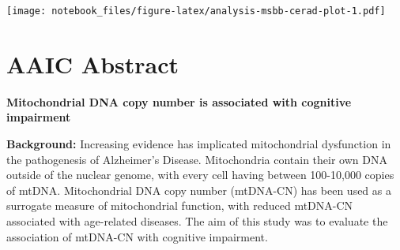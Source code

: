 \documentclass[]{book}
\newenvironment{Shaded}{\begin{snugshade}}{\end{snugshade}}
\newcommand{\CommentTok}[1]{\textcolor[rgb]{0.56,0.35,0.01}{\textit{#1}}}
\newcommand{\ControlFlowTok}[1]{\textcolor[rgb]{0.13,0.29,0.53}{\textbf{#1}}}
\newcommand{\DataTypeTok}[1]{\textcolor[rgb]{0.13,0.29,0.53}{#1}}
\newcommand{\DecValTok}[1]{\textcolor[rgb]{0.00,0.00,0.81}{#1}}
\newcommand{\FloatTok}[1]{\textcolor[rgb]{0.00,0.00,0.81}{#1}}
\newcommand{\KeywordTok}[1]{\textcolor[rgb]{0.13,0.29,0.53}{\textbf{#1}}}
\newcommand{\NormalTok}[1]{#1}
\newcommand{\OperatorTok}[1]{\textcolor[rgb]{0.81,0.36,0.00}{\textbf{#1}}}
\newcommand{\StringTok}[1]{\textcolor[rgb]{0.31,0.60,0.02}{#1}}
\begin{document}
\begin{Shaded}
\end{Shaded}

\texttt{[image: notebook\_files/figure-latex/analysis-msbb-cerad-plot-1.pdf]}

\hypertarget{aaic-abstract}{%
\chapter{AAIC Abstract}\label{aaic-abstract}}

\textbf{Mitochondrial DNA copy number is associated with cognitive impairment}

\textbf{Background:} Increasing evidence has implicated mitochondrial dysfunction in the pathogenesis of Alzheimer's Disease. Mitochondria contain their own DNA outside of the nuclear genome, with every cell having between 100-10,000 copies of mtDNA. Mitochondrial DNA copy number (mtDNA-CN) has been used as a surrogate measure of mitochondrial function, with reduced mtDNA-CN associated with age-related diseases. The aim of this study was to evaluate the association of mtDNA-CN with cognitive impairment.
\end{document}
